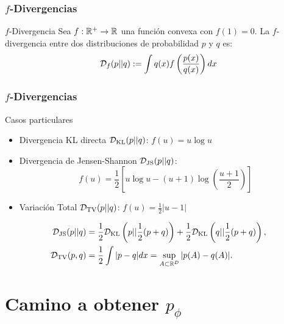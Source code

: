 \documentclass{beamer}
\begin{document}
\begin{frame}
	\frametitle{$f$-Divergencias}
	\begin{definitionblock}{$f$-Divergencia}
		Sea $f: \mathbb{R}^{+} \to \mathbb{R}$ una función convexa con $f(1) = 0$. La $f$-divergencia entre dos distribuciones de probabilidad $p$ y $q$ es:
		\begin{equation*}
			\mathcal{D}_f(p || q)
			:= \int q(x) f\left( \frac{p(x)}{q(x)} \right) dx
		\end{equation*}
	\end{definitionblock}
\end{frame}
\begin{frame}
	\frametitle{$f$-Divergencias}
	\begin{exampleblock}{Casos particulares}
		\begin{itemize}
			\item Divergencia KL directa $\mathcal{D}_{\text{KL}}(p || q)$:
			$ f(u) = u \log u $
			\item Divergencia de Jensen-Shannon $\mathcal{D}_{\text{JS}}(p || q)$:
			$$ f(u) = \frac{1}{2} \left[ u\log u - (u+1) \log\left(\frac{u+1}{2}\right)\right] $$
			\item Variación Total $\mathcal{D}_{\text{TV}}(p || q)$:
			$ f(u) = \frac{1}{2} |u-1| $
		\end{itemize}
	\end{exampleblock}\pause
		\begin{align*}
			\mathcal{D}_{\text{JS}}(p || q) &= \frac{1}{2} \mathcal{D}_{\text{KL}}\left(p || \frac{1}{2}(p+q)\right) + \frac{1}{2} \mathcal{D}_{\text{KL}}\left(q || \frac{1}{2}(p+q)\right),\\
			\mathcal{D}_{\text{TV}}(p, q) &= \frac{1}{2} \int |p - q| dx = \sup_{A \subset \mathbb{R}^D} |p(A) - q(A)|.
		\end{align*}
\end{frame}


\section{Camino a obtener $p_{\phi}$}
\end{document}
